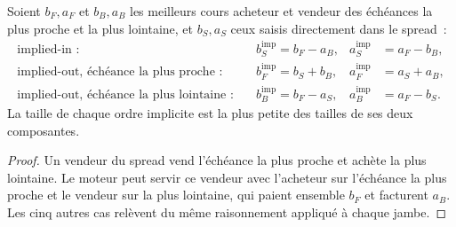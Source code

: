 \begin{proposition}\label{prop:m1:matching-algorithms-and-implied-spreads:implied}
Soient $b_F, a_F$ et $b_B, a_B$ les meilleurs cours acheteur et vendeur des
échéances la plus proche et la plus lointaine, et $b_S, a_S$ ceux saisis directement dans le spread~:
\begin{align*}
\text{implied-in~:}\quad & b_S^{\text{imp}} = b_F - a_B, & a_S^{\text{imp}} &= a_F - b_B,\\
\text{implied-out, échéance la plus proche~:}\quad & b_F^{\text{imp}} = b_S + b_B, & a_F^{\text{imp}} &= a_S + a_B,\\
\text{implied-out, échéance la plus lointaine~:}\quad & b_B^{\text{imp}} = b_F - a_S, & a_B^{\text{imp}} &= a_F - b_S.
\end{align*}
La taille de chaque ordre implicite est la plus petite des tailles de ses deux composantes.
\end{proposition}
\begin{proof}
Un vendeur du spread vend l'échéance la plus proche et achète la plus lointaine. Le moteur peut
servir ce vendeur avec l'acheteur sur l'échéance la plus proche et le vendeur sur la plus lointaine, qui
paient ensemble $b_F$ et facturent $a_B$. Les cinq autres cas relèvent du même raisonnement appliqué
à chaque jambe.
\end{proof}


